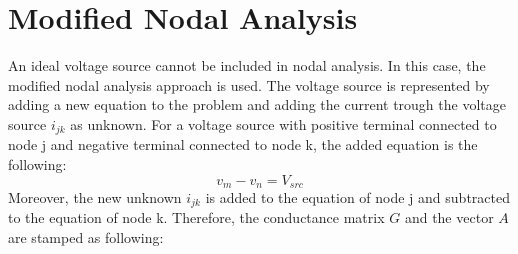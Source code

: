 \section{Modified Nodal Analysis} 
\label{sec:mna}
An ideal voltage source cannot be included in nodal analysis. In this case, the modified nodal analysis approach is used. The voltage source is represented by adding a new equation to the problem and adding the current trough the voltage source $i_{jk}$ as unknown. 
For a voltage source with positive terminal connected to node j and negative terminal connected to node k, the added equation is the following:
\begin{equation}
v_m - v_n = V_{src}
\end{equation}
Moreover, the new unknown $i_{jk}$ is added to the equation of node j and subtracted to the equation of node k.
Therefore, the conductance matrix $G$ and the vector $A$ are stamped as following:

